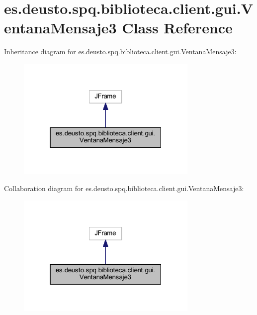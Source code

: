 \hypertarget{classes_1_1deusto_1_1spq_1_1biblioteca_1_1client_1_1gui_1_1_ventana_mensaje3}{}\section{es.\+deusto.\+spq.\+biblioteca.\+client.\+gui.\+Ventana\+Mensaje3 Class Reference}
\label{classes_1_1deusto_1_1spq_1_1biblioteca_1_1client_1_1gui_1_1_ventana_mensaje3}


Inheritance diagram for es.\+deusto.\+spq.\+biblioteca.\+client.\+gui.\+Ventana\+Mensaje3\+:
\nopagebreak
\begin{figure}[H]
\begin{center}
\leavevmode
\includegraphics[width=247pt]{classes_1_1deusto_1_1spq_1_1biblioteca_1_1client_1_1gui_1_1_ventana_mensaje3__inherit__graph}
\end{center}
\end{figure}


Collaboration diagram for es.\+deusto.\+spq.\+biblioteca.\+client.\+gui.\+Ventana\+Mensaje3\+:
\nopagebreak
\begin{figure}[H]
\begin{center}
\leavevmode
\includegraphics[width=247pt]{classes_1_1deusto_1_1spq_1_1biblioteca_1_1client_1_1gui_1_1_ventana_mensaje3__coll__graph}
\end{center}
\end{figure}
